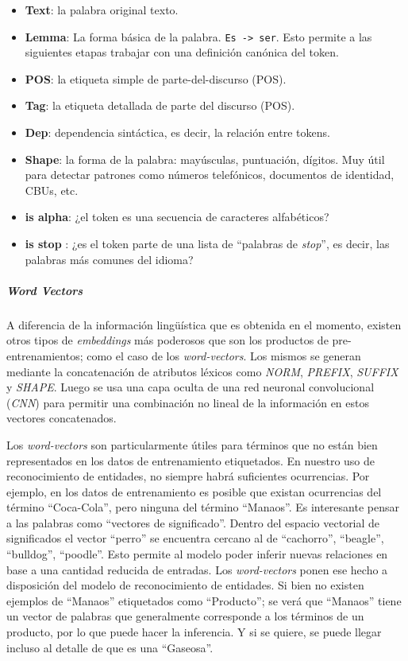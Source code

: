 \documentclass[12pt,a4paper,]{scrartcl}
\providecommand{\tightlist}{%
  \setlength{\itemsep}{0pt}\setlength{\parskip}{0pt}}
\let\oldsubparagraph\subparagraph
\renewcommand{\subparagraph}[1]{\oldsubparagraph{#1}\mbox{}}
\begin{document}
\begin{itemize}
\tightlist
\item
  \textbf{Text}: la palabra original texto.
\item
  \textbf{Lemma}: La forma básica de la palabra. \texttt{Es\ -\textgreater{}\ ser}. Esto permite a las siguientes etapas trabajar con una definición canónica del token.
\item
  \textbf{POS}: la etiqueta simple de parte-del-discurso (POS).
\item
  \textbf{Tag}: la etiqueta detallada de parte del discurso (POS).
\item
  \textbf{Dep}: dependencia sintáctica, es decir, la relación entre tokens.
\item
  \textbf{Shape}: la forma de la palabra: mayúsculas, puntuación, dígitos. Muy útil para detectar patrones como números telefónicos, documentos de identidad, CBUs, etc.
\item
  \textbf{is alpha}: ¿el token es una secuencia de caracteres alfabéticos?
\item
  \textbf{is stop} : ¿es el token parte de una lista de \enquote{palabras de \emph{stop}}, es decir, las palabras más comunes del idioma?
\end{itemize}

\hypertarget{word-vectors}{%
\subparagraph{\texorpdfstring{\emph{Word Vectors}}{Word Vectors}}\label{word-vectors}}

A diferencia de la información lingüística que es obtenida en el momento, existen otros tipos de \emph{embeddings} más poderosos que son los productos de pre-entrenamientos; como el caso de los \emph{word-vectors}. Los mismos se generan mediante la concatenación de atributos léxicos como \emph{NORM}, \emph{PREFIX}, \emph{SUFFIX} y \emph{SHAPE}. Luego se usa una capa oculta de una red neuronal convolucional (\emph{CNN}) para permitir una combinación no lineal de la información en estos vectores concatenados.

Los \emph{word-vectors} son particularmente útiles para términos que no están bien representados en los datos de entrenamiento etiquetados. En nuestro uso de reconocimiento de entidades, no siempre habrá suficientes ocurrencias. Por ejemplo, en los datos de entrenamiento es posible que existan ocurrencias del término \enquote{Coca-Cola}, pero ninguna del término \enquote{Manaos}.
Es interesante pensar a las palabras como \enquote{vectores de significado}. Dentro del espacio vectorial de significados el vector \enquote{perro} se encuentra cercano al de \enquote{cachorro}, \enquote{beagle}, \enquote{bulldog}, \enquote{poodle}. Esto permite al modelo poder inferir nuevas relaciones en base a una cantidad reducida de entradas.
Los \emph{word-vectors} ponen ese hecho a disposición del modelo de reconocimiento de entidades. Si bien no existen ejemplos de \enquote{Manaos} etiquetados como \enquote{Producto}; se verá que \enquote{Manaos} tiene un vector de palabras que generalmente corresponde a los términos de un producto, por lo que puede hacer la inferencia. Y si se quiere, se puede llegar incluso al detalle de que es una \enquote{Gaseosa}.
\end{document}
